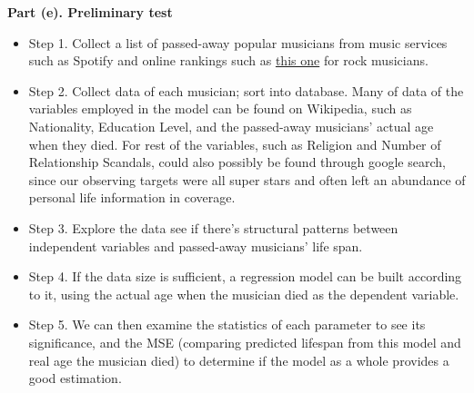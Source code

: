 \documentclass[letterpaper,10pt]{article}
\theoremstyle{definition}
\begin{document}
\noindent\textbf{Part (e). Preliminary test}
\begin{itemize}
\item Step 1. Collect a list of passed-away popular musicians from music services such as Spotify and online rankings such as \href{http://rateyourmusic.com/list/eddythefan/100_greatest_rock_stars/}{this one} for rock musicians.
\item Step 2. Collect data of each musician; sort into database. Many of data of the variables employed in the model can be found on Wikipedia, such as Nationality, Education Level, and the passed-away musicians’ actual age when they died. For rest of the variables, such as Religion and Number of Relationship Scandals, could also possibly be found through google search, since our observing targets were all super stars and often left an abundance of personal life information in coverage.
\item Step 3. Explore the data see if there’s structural patterns between independent variables and passed-away musicians’ life span.
\item Step 4. If the data size is sufficient, a regression model can be built according to it, using the actual age when the musician died as the dependent variable.
\item Step 5. We can then examine the statistics of each parameter to see its significance, and the MSE (comparing predicted lifespan from this model and real age the musician died) to determine if the model as a whole provides a good estimation.
\end{itemize}
\end{document}

